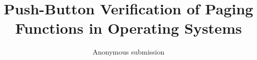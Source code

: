 \documentclass[letterpaper,twocolumn,10pt]{article}
\begin{document}
\pagestyle{plain}
\date{}

\title{Push-Button Verification of Paging Functions in Operating Systems}

\author{Anonymous submission}

\maketitle









%



\appendix


%
\end{document}
